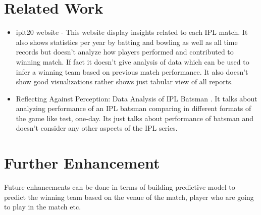 \section{Related Work} \label{relwork}
\begin {itemize}
\item
iplt20 website - \cite{www-iplt20} 
This website display insights related to each IPL match. It also shows statistics per year
by batting and bowling as well as all time records but doesn't analyze how players
performed and contributed to winning match. If fact it doesn't give analysis of data which
can be used to infer a winning team based on previous match performance. It also doesn't
show good visualizations rather shows just tabular view of all reports.

\item
Reflecting Against Perception: Data Analysis of IPL Batsman \cite{kumar2014reflecting}.
It talks about analyzing performance of an IPL batsman comparing in different formats of 
the game like test, one-day. Its just talks about performance of batsman and doesn't consider
any other aspects of the IPL series. 

\end {itemize}

\section{Further Enhancement} \label{enhancements}
Future enhancements can be done in-terms of building predictive model to predict the winning team
based on the venue of the match, player who are going to play in the match etc.
